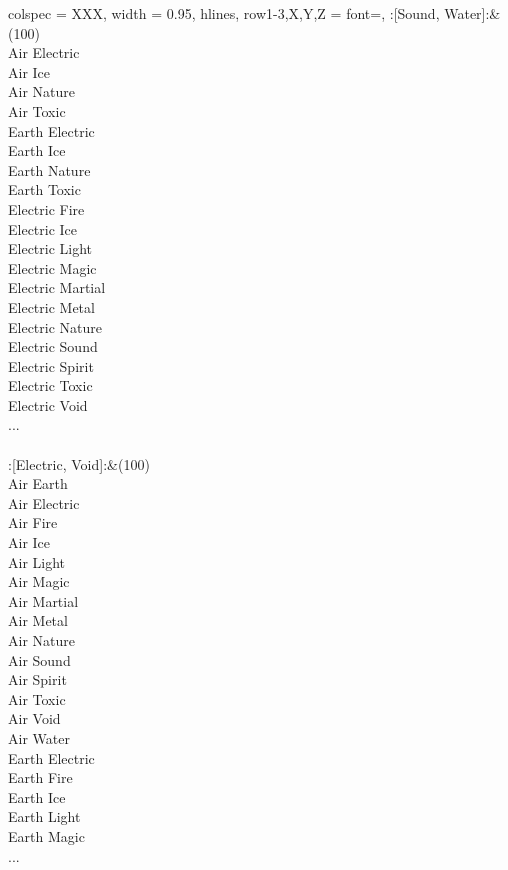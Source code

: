 \begin{longtblr}[
	caption = {2v2 Defending Weak},
	label = {2v2-Defending-Weak},
]{
	colspec = {XXX}, width = 0.95\linewidth,
	hlines,
	row{1-3,X,Y,Z} = {font=\bfseries},
}
	:[Sound, Water]:&{(100)\\
	Air Electric \\
	Air Ice \\
	Air Nature \\
	Air Toxic \\
	Earth Electric \\
	Earth Ice \\
	Earth Nature \\
	Earth Toxic \\
	Electric Fire \\
	Electric Ice \\
	Electric Light \\
	Electric Magic \\
	Electric Martial \\
	Electric Metal \\
	Electric Nature \\
	Electric Sound \\
	Electric Spirit \\
	Electric Toxic \\
	Electric Void \\
	...\\
	}\\

	:[Electric, Void]:&{(100)\\
	Air Earth \\
	Air Electric \\
	Air Fire \\
	Air Ice \\
	Air Light \\
	Air Magic \\
	Air Martial \\
	Air Metal \\
	Air Nature \\
	Air Sound \\
	Air Spirit \\
	Air Toxic \\
	Air Void \\
	Air Water \\
	Earth Electric \\
	Earth Fire \\
	Earth Ice \\
	Earth Light \\
	Earth Magic \\
	...\\
	}\\


\end{longtblr}
